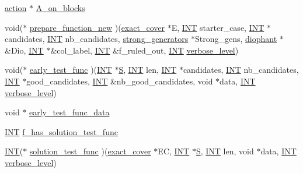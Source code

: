\begin{DoxyCompactItemize}
\item 
\mbox{\hyperlink{classaction}{action}} $\ast$ \mbox{\hyperlink{classexact__cover_a4575200536fca630a03696141f78d367}{A\+\_\+on\+\_\+blocks}}
\item 
void($\ast$ \mbox{\hyperlink{classexact__cover_a041faf4056c95b678e4c2cdcc1703c4d}{prepare\+\_\+function\+\_\+new}} )(\mbox{\hyperlink{classexact__cover}{exact\+\_\+cover}} $\ast$E, \mbox{\hyperlink{galois_8h_a09fddde158a3a20bd2dcadb609de11dc}{I\+NT}} starter\+\_\+case, \mbox{\hyperlink{galois_8h_a09fddde158a3a20bd2dcadb609de11dc}{I\+NT}} $\ast$candidates, \mbox{\hyperlink{galois_8h_a09fddde158a3a20bd2dcadb609de11dc}{I\+NT}} nb\+\_\+candidates, \mbox{\hyperlink{classstrong__generators}{strong\+\_\+generators}} $\ast$Strong\+\_\+gens, \mbox{\hyperlink{classdiophant}{diophant}} $\ast$\&Dio, \mbox{\hyperlink{galois_8h_a09fddde158a3a20bd2dcadb609de11dc}{I\+NT}} $\ast$\&col\+\_\+label, \mbox{\hyperlink{galois_8h_a09fddde158a3a20bd2dcadb609de11dc}{I\+NT}} \&f\+\_\+ruled\+\_\+out, \mbox{\hyperlink{galois_8h_a09fddde158a3a20bd2dcadb609de11dc}{I\+NT}} \mbox{\hyperlink{simeon_8_c_a818073fbcc2f439e7c56952f67386122}{verbose\+\_\+level}})
\item 
void($\ast$ \mbox{\hyperlink{classexact__cover_a41de15ab23a16d4f722cb0ffa2704bb5}{early\+\_\+test\+\_\+func}} )(\mbox{\hyperlink{galois_8h_a09fddde158a3a20bd2dcadb609de11dc}{I\+NT}} $\ast$\mbox{\hyperlink{simeon_8_c_adab47f8243f1b5a2c31df2535d6b37d0}{S}}, \mbox{\hyperlink{galois_8h_a09fddde158a3a20bd2dcadb609de11dc}{I\+NT}} len, \mbox{\hyperlink{galois_8h_a09fddde158a3a20bd2dcadb609de11dc}{I\+NT}} $\ast$candidates, \mbox{\hyperlink{galois_8h_a09fddde158a3a20bd2dcadb609de11dc}{I\+NT}} nb\+\_\+candidates, \mbox{\hyperlink{galois_8h_a09fddde158a3a20bd2dcadb609de11dc}{I\+NT}} $\ast$good\+\_\+candidates, \mbox{\hyperlink{galois_8h_a09fddde158a3a20bd2dcadb609de11dc}{I\+NT}} \&nb\+\_\+good\+\_\+candidates, void $\ast$data, \mbox{\hyperlink{galois_8h_a09fddde158a3a20bd2dcadb609de11dc}{I\+NT}} \mbox{\hyperlink{simeon_8_c_a818073fbcc2f439e7c56952f67386122}{verbose\+\_\+level}})
\item 
void $\ast$ \mbox{\hyperlink{classexact__cover_a374e98bfbc8d4a49b663c5bd28e38e8d}{early\+\_\+test\+\_\+func\+\_\+data}}
\item 
\mbox{\hyperlink{galois_8h_a09fddde158a3a20bd2dcadb609de11dc}{I\+NT}} \mbox{\hyperlink{classexact__cover_adb3f3bca09f979108f007c0c2949ce2e}{f\+\_\+has\+\_\+solution\+\_\+test\+\_\+func}}
\item 
\mbox{\hyperlink{galois_8h_a09fddde158a3a20bd2dcadb609de11dc}{I\+NT}}($\ast$ \mbox{\hyperlink{classexact__cover_a9de554975b36905186289a67786cc21f}{solution\+\_\+test\+\_\+func}} )(\mbox{\hyperlink{classexact__cover}{exact\+\_\+cover}} $\ast$EC, \mbox{\hyperlink{galois_8h_a09fddde158a3a20bd2dcadb609de11dc}{I\+NT}} $\ast$\mbox{\hyperlink{simeon_8_c_adab47f8243f1b5a2c31df2535d6b37d0}{S}}, \mbox{\hyperlink{galois_8h_a09fddde158a3a20bd2dcadb609de11dc}{I\+NT}} len, void $\ast$data, \mbox{\hyperlink{galois_8h_a09fddde158a3a20bd2dcadb609de11dc}{I\+NT}} \mbox{\hyperlink{simeon_8_c_a818073fbcc2f439e7c56952f67386122}{verbose\+\_\+level}})

\end{DoxyCompactItemize}
